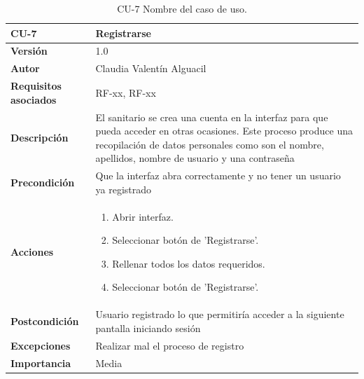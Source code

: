 \begin{table}[p]
	\centering
	\begin{tabularx}{\linewidth}{ p{} p{} }
		\toprule
		\textbf{CU-7}    & \textbf{Registrarse}\\
		\toprule
		\textbf{Versión}              & 1.0    \\
		\textbf{Autor}                & Claudia Valentín Alguacil \\
		\textbf{Requisitos asociados} & RF-xx, RF-xx \\
		\textbf{Descripción}          & El sanitario se crea una cuenta en la interfaz para que pueda acceder en otras ocasiones. Este proceso produce una recopilación de datos personales como son el nombre, apellidos, nombre de usuario y  una contraseña  \\
		\textbf{Precondición}         & Que la interfaz abra correctamente y no tener un usuario ya registrado \\
		\textbf{Acciones}             &
		\begin{enumerate}
			\def\labelenumi{\arabic{enumi}.}
			\tightlist
			\item Abrir interfaz.
			\item Seleccionar botón de 'Registrarse'.
                \item Rellenar todos los datos requeridos.
                \item Seleccionar botón de 'Registrarse'.
		\end{enumerate}\\
		\textbf{Postcondición}        &  Usuario registrado lo que permitiría acceder a la siguiente pantalla iniciando sesión \\
		\textbf{Excepciones}          & Realizar mal el proceso de registro \\
		\textbf{Importancia}          & Media \\
		\bottomrule
	\end{tabularx}
	\caption{CU-7 Nombre del caso de uso.}
\end{table}

